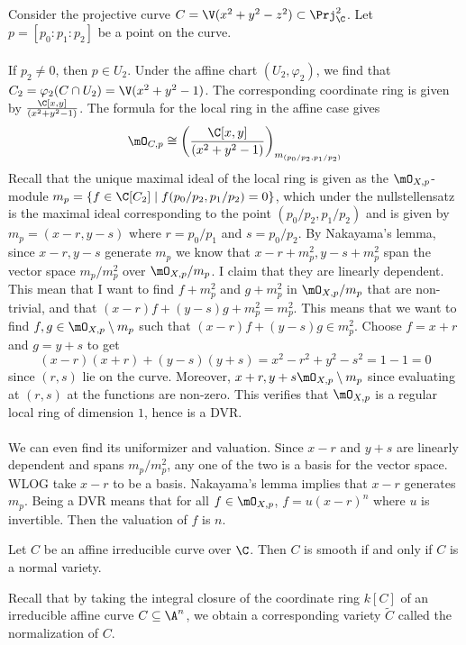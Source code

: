\documentclass[a4paper]{article}
\begin{document}
\begin{eg}{}{} Consider the projective curve $C=\V(x^2+y^2-z^2)\subset\Prj_\C^2$. Let $p=[p_0:p_1:p_2]$ be a point on the curve. \\~\\

If $p_2\neq 0$, then $p\in U_2$. Under the affine chart $(U_2,\varphi_2)$, we find that $C_2=\varphi_2(C\cap U_2)=\V(x^2+y^2-1)$. The corresponding coordinate ring is given by $\frac{\C[x,y]}{(x^2+y^2-1)}$. The formula for the local ring in the affine case gives $$\mO_{C,p}\cong\left(\frac{\C[x,y]}{(x^2+y^2-1)}\right)_{m_{(p_0/p_2,p_1/p_2)}}$$ Recall that the unique maximal ideal of the local ring is given as the $\mO_{X,p}$-module $m_p=\{f\in\C[C_2]\;|\;f(p_0/p_2,p_1/p_2)=0\}$, which under the nullstellensatz is the maximal ideal corresponding to the point $(p_0/p_2,p_1/p_2)$ and is given by $m_p=(x-r,y-s)$ where $r=p_0/p_1$ and $s=p_0/p_2$. By Nakayama's lemma, since $x-r,y-s$ generate $m_p$ we know that $x-r+m_p^2,y-s+m_p^2$ span the vector space $m_p/m_p^2$ over $\mO_{X,p}/m_p$. I claim that they are linearly dependent. This mean that I want to find $f+m_p^2$ and $g+m_p^2$ in $\mO_{X,p}/m_p$ that are non-trivial, and that $(x-r)f+(y-s)g+m_p^2=m_p^2$. This means that we want to find $f,g\in\mO_{X,p}\setminus m_p$ such that $(x-r)f+(y-s)g\in m_p^2$. Choose $f=x+r$ and $g=y+s$ to get $$(x-r)(x+r)+(y-s)(y+s)=x^2-r^2+y^2-s^2=1-1=0$$ since $(r,s)$ lie on the curve. Moreover, $x+r,y+s\mO_{X,p}\setminus m_p$ since evaluating at $(r,s)$ at the functions are non-zero. This verifies that $\mO_{X,p}$ is a regular local ring of dimension $1$, hence is a DVR. \\~\\

We can even find its uniformizer and valuation. Since $x-r$ and $y+s$ are linearly dependent and spans $m_p/m_p^2$, any one of the two is a basis for the vector space. WLOG take $x-r$ to be a basis. Nakayama's lemma implies that $x-r$ generates $m_p$. Being a DVR means that for all $f\in\mO_{X,p}$, $f=u(x-r)^n$ where $u$ is invertible. Then the valuation of $f$ is $n$. 
\end{eg}

\begin{prp}{}{} Let $C$ be an affine irreducible curve over $\C$. Then $C$ is smooth if and only if $C$ is a normal variety. 
\end{prp}

Recall that by taking the integral closure of the coordinate ring $k[C]$ of an irreducible affine curve $C\subseteq\A^n$, we obtain a corresponding variety $\widetilde{C}$ called the normalization of $C$. \\
\end{document}

